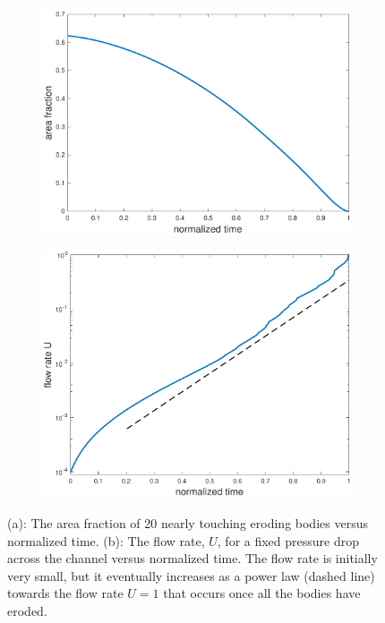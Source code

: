 \documentclass[preprint,10pt]{elsarticle}
\begin{document}
\begin{figure}[H]
\begin{subfigure}[b]{0.5\textwidth}
\includegraphics*[height = 0.7\linewidth]{./figs/porosity20dense}
\caption{}
\end{subfigure}
\begin{subfigure}[b]{0.5\textwidth}
\includegraphics*[height = 0.7\linewidth]{./figs/flow_rate20dense}
\caption{}
\end{subfigure}
\caption{\label{fig:Eroding20flowrate}(a): The area fraction of 20
nearly touching eroding bodies versus normalized time. (b): The flow
rate, $U$, for a fixed pressure drop across the channel versus
normalized time.  The flow rate is initially very small, but it
eventually increases as a power law (dashed line) towards the flow rate
$U=1$ that occurs once all the bodies have eroded.}
\end{figure}
\end{document}
